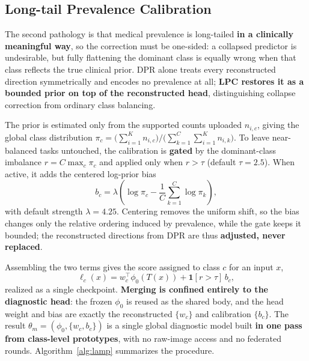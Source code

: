 \documentclass[letterpaper]{article} %
\begin{document}
\subsection{Long-tail Prevalence Calibration}

The second pathology is that medical prevalence is long-tailed \textbf{in a clinically meaningful way}, so the correction must be one-sided: a collapsed predictor is undesirable, but fully flattening the dominant class is equally wrong when that class reflects the true clinical prior. DPR alone treats every reconstructed direction symmetrically and encodes no prevalence at all; \textbf{LPC restores it as a bounded prior on top of the reconstructed head}, distinguishing collapse correction from ordinary class balancing.

The prior is estimated only from the supported counts uploaded $n_{i,c}$, giving the global class distribution $\pi_c=\big(\sum_{i=1}^{K}n_{i,c}\big)/\big(\sum_{k=1}^{C}\sum_{i=1}^{K}n_{i,k}\big)$. To leave near-balanced tasks untouched, the calibration is \textbf{gated} by the dominant-class imbalance $r=C\max_c\pi_c$ and applied only when $r>\tau$ (default $\tau=2.5$). When active, it adds the centered log-prior bias
\begin{equation}
b_c=\lambda\left(\log\pi_c-\frac{1}{C}\sum_{k=1}^{C}\log\pi_k\right),
\end{equation}
with default strength $\lambda=4.25$. Centering removes the uniform shift, so the bias changes only the relative ordering induced by prevalence, while the gate keeps it bounded; the reconstructed directions from DPR are thus \textbf{adjusted, never replaced}.

Assembling the two terms gives the score assigned to class $c$ for an input $x$,
\begin{equation}
\ell_c(x)=w_c^{\top}\phi_0(T(x))+\mathbf{1}[r>\tau]\,b_c,
\label{eq:score}
\end{equation}
realized as a single checkpoint. \textbf{Merging is confined entirely to the diagnostic head}: the frozen $\phi_0$ is reused as the shared body, and the head weight and bias are exactly the reconstructed $\{w_c\}$ and calibration $\{b_c\}$. The result $\theta_m=(\phi_0,\{w_c,b_c\})$ is a single global diagnostic model built \textbf{in one pass from class-level prototypes}, with no raw-image access and no federated rounds. Algorithm~\ref{alg:lamp} summarizes the procedure.
\end{document}

